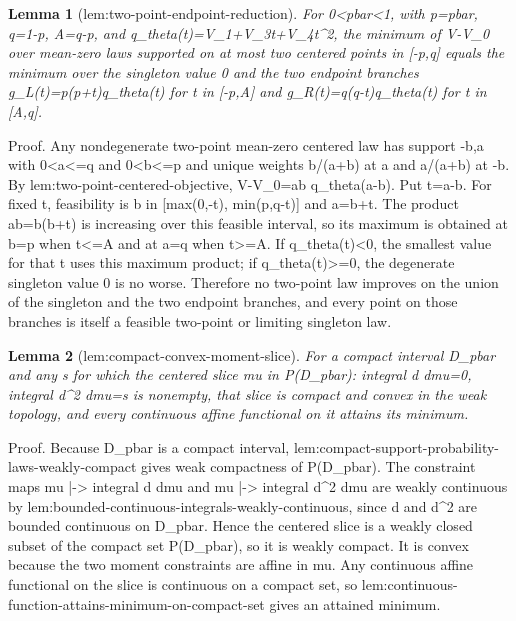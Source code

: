 \documentclass{article}
\newtheorem{lemma}{Lemma}
\begin{document}
\begin{lemma}[lem:two-point-endpoint-reduction]\label{lem:two-point-endpoint-reduction}
For 0<pbar<1, with p=pbar, q=1-p, A=q-p, and q_theta(t)=V_1+V_3t+V_4t^2, the minimum of V-V_0 over mean-zero laws supported on at most two centered points in [-p,q] equals the minimum over the singleton value 0 and the two endpoint branches g_L(t)=p(p+t)q_theta(t) for t in [-p,A] and g_R(t)=q(q-t)q_theta(t) for t in [A,q].
\end{lemma}
Proof. Any nondegenerate two-point mean-zero centered law has support {-b,a} with 0<a<=q and 0<b<=p and unique weights b/(a+b) at a and a/(a+b) at -b. By lem:two-point-centered-objective, V-V_0=ab q_theta(a-b). Put t=a-b. For fixed t, feasibility is b in [max(0,-t), min(p,q-t)] and a=b+t. The product ab=b(b+t) is increasing over this feasible interval, so its maximum is obtained at b=p when t<=A and at a=q when t>=A. If q_theta(t)<0, the smallest value for that t uses this maximum product; if q_theta(t)>=0, the degenerate singleton value 0 is no worse. Therefore no two-point law improves on the union of the singleton and the two endpoint branches, and every point on those branches is itself a feasible two-point or limiting singleton law.

\begin{lemma}[lem:compact-convex-moment-slice]\label{lem:compact-convex-moment-slice}
For a compact interval D_pbar and any s for which the centered slice {mu in P(D_pbar): integral d dmu=0, integral d^2 dmu=s} is nonempty, that slice is compact and convex in the weak topology, and every continuous affine functional on it attains its minimum.
\end{lemma}
Proof. Because D_pbar is a compact interval, lem:compact-support-probability-laws-weakly-compact gives weak compactness of P(D_pbar). The constraint maps mu |-> integral d dmu and mu |-> integral d^2 dmu are weakly continuous by lem:bounded-continuous-integrals-weakly-continuous, since d and d^2 are bounded continuous on D_pbar. Hence the centered slice is a weakly closed subset of the compact set P(D_pbar), so it is weakly compact. It is convex because the two moment constraints are affine in mu. Any continuous affine functional on the slice is continuous on a compact set, so lem:continuous-function-attains-minimum-on-compact-set gives an attained minimum.
\end{document}
